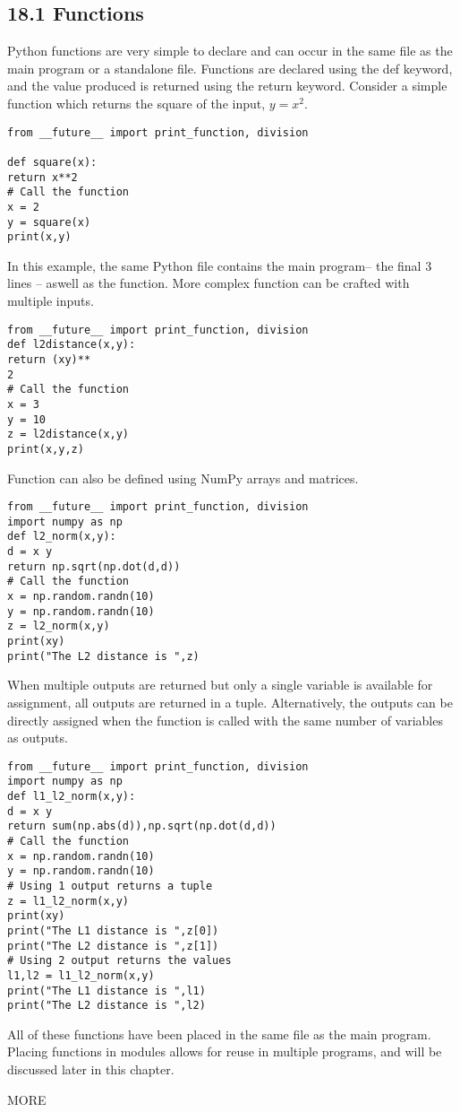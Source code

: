 \documentclass[KSmain.tex]{subfiles}
\begin{document}
\subsection{18.1 Functions}
Python functions are very simple to declare and can occur in the same file as the main program or a standalone
file. Functions are declared using the def keyword, and the value produced is returned using the
return keyword. Consider a simple function which returns the square of the input, $y = x^2$.
\begin{verbatim}
from __future__ import print_function, division

def square(x):
return x**2
# Call the function
x = 2
y = square(x)
print(x,y)
\end{verbatim}
In this example, the same Python file contains the main program– the final 3 lines – aswell as the function.
More complex function can be crafted with multiple inputs.
\begin{verbatim}
from __future__ import print_function, division
def l2distance(x,y):
return (xy)**
2
# Call the function
x = 3
y = 10
z = l2distance(x,y)
print(x,y,z)
\end{verbatim}
Function can also be defined using NumPy arrays and matrices.
\begin{verbatim}
from __future__ import print_function, division
import numpy as np
def l2_norm(x,y):
d = x y
return np.sqrt(np.dot(d,d))
# Call the function
x = np.random.randn(10)
y = np.random.randn(10)
z = l2_norm(x,y)
print(xy)
print("The L2 distance is ",z)
\end{verbatim}
When multiple outputs are returned but only a single variable is available for assignment, all outputs are
returned in a tuple. Alternatively, the outputs can be directly assigned when the function is called with
the same number of variables as outputs.
\begin{verbatim}
from __future__ import print_function, division
import numpy as np
def l1_l2_norm(x,y):
d = x y
return sum(np.abs(d)),np.sqrt(np.dot(d,d))
# Call the function
x = np.random.randn(10)
y = np.random.randn(10)
# Using 1 output returns a tuple
z = l1_l2_norm(x,y)
print(xy)
print("The L1 distance is ",z[0])
print("The L2 distance is ",z[1])
# Using 2 output returns the values
l1,l2 = l1_l2_norm(x,y)
print("The L1 distance is ",l1)
print("The L2 distance is ",l2)
\end{verbatim}
All of these functions have been placed in the same file as the main program. Placing functions in modules
allows for reuse in multiple programs, and will be discussed later in this chapter.

MORE
\end{document}
